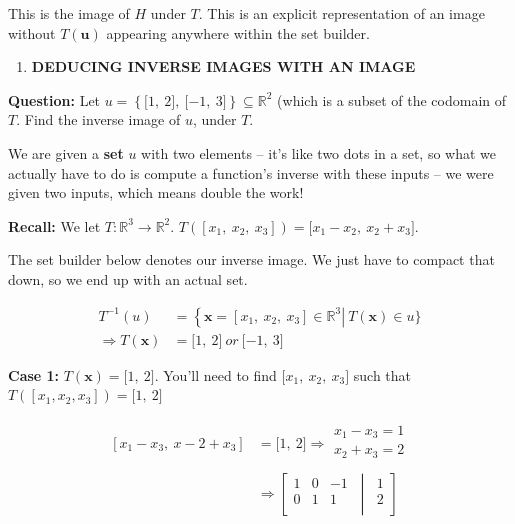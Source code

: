 \documentclass[
]{article}
\begin{document}
This is the image of $H$ under $T$. This is an explicit
representation of an image without $T(\mathbf{u})$ appearing
anywhere within the set builder.

\begin{enumerate}
\def\labelenumi{\arabic{enumi}.}
\setcounter{enumi}{2}
\item
  \textbf{DEDUCING INVERSE IMAGES WITH AN IMAGE}
\end{enumerate}

\textbf{Question:} Let
$u = \left\{ \lbrack 1,\ 2\rbrack,\ \lbrack - 1,\ 3\rbrack \right\} \subseteq \mathbb{R}^{2}$
(which is a subset of the codomain of $T$. Find the inverse image of
$u$, under $T$.

We are given a \textbf{set} $u$ with two elements -- it's like two
dots in a set, so what we actually have to do is compute a function's
inverse with these inputs -- we were given two inputs, which means
double the work!

\textbf{Recall:} We let $T:\mathbb{R}^{3} \rightarrow \mathbb{R}^{2}$.
$T\left( \left\lbrack x_{1},\ x_{2},\ x_{3} \right\rbrack \right) = \lbrack x_{1} - x_{2},\ x_{2} + x_{3}\rbrack$.

The set builder below denotes our inverse image. We just have to compact
that down, so we end up with an actual set.

\begin{align*}
T^{- 1}(u) &= \left\{ \mathbf{x} = \left\lbrack x_{1},\ x_{2},\ x_{3} \right\rbrack \in \mathbb{R}^{3} \right|\ T\left( \mathbf{x} \right) \in u\}
 \\
\Rightarrow T\left( \mathbf{x} \right) &= \lbrack 1,\ 2\rbrack\ or\ \lbrack - 1,\ 3\rbrack
\end{align*}


\textbf{Case 1:}
$T\left( \mathbf{x} \right) = \lbrack 1,\ 2\rbrack$. You'll need
to find $\lbrack x_{1},\ x_{2},\ x_{3}\rbrack$ such that
$T\left( \left\lbrack x_{1},x_{2},x_{3} \right\rbrack \right) = \lbrack 1,\ 2\rbrack$

\begin{align*}
\left\lbrack x_{1} - x_{3},\ x - 2 + x_{3} \right\rbrack &= \lbrack 1,\ 2\rbrack \Rightarrow \begin{matrix}
x_{1} - x_{3} = 1 \\
x_{2} + x_{3} = 2 \\
\end{matrix}
 \\
&\Rightarrow \left\lbrack \begin{matrix}
1 & 0 & - 1 \\
0 & 1 & 1 \\
\end{matrix}\  \middle| \ \begin{matrix}
1 \\
2 \\
\end{matrix} \right\rbrack
\end{align*}
\end{document}
